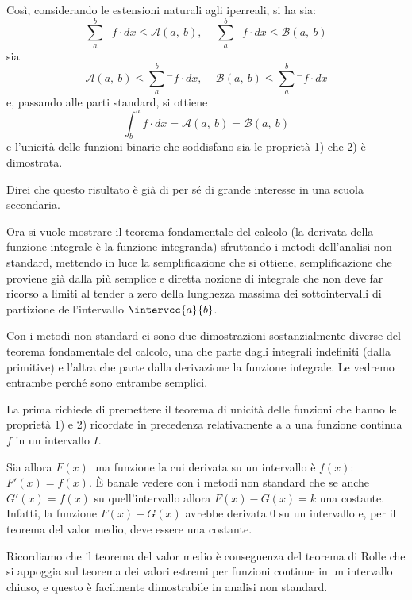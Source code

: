 Così, 
considerando le estensioni naturali agli iperreali, si ha sia:
\[\sum_a^b {}_{-}f \cdot dx \le \mathcal{A}(a,~b) \text{, } \quad
  \sum_a^b {}_{-}f \cdot dx \le \mathcal{B}(a,~b)\]
sia 
\[\mathcal{A}(a,~b) \le \sum_a^b {}^{-}f \cdot dx \text{, } \quad
  \mathcal{B}(a,~b) \le \sum_a^b {}^{-}f \cdot dx\] 
e, passando alle parti standard, si ottiene 
\[\int_b^a f \cdot dx = \mathcal{A}(a,~b) = \mathcal{B}(a,~b)\]
e l'unicità delle funzioni binarie che soddisfano sia le proprietà 1) che 2) 
è dimostrata. 

Direi che questo risultato è già di per sé di grande interesse in una scuola 
secondaria. 

Ora si vuole mostrare il teorema fondamentale del calcolo (la derivata della 
funzione integrale è la funzione integranda) sfruttando i 
metodi dell'analisi non standard, mettendo in luce la semplificazione che si 
ottiene, semplificazione che proviene già dalla più semplice e diretta 
nozione di integrale che non deve far ricorso a limiti al tender a zero della 
lunghezza massima dei sottointervalli di partizione dell'intervallo 
\(\intervcc{a}{b}\). 

Con i metodi non standard ci sono due dimostrazioni sostanzialmente diverse 
del teorema fondamentale del calcolo, una che parte dagli integrali 
indefiniti 
(dalla primitive) e l'altra che parte dalla derivazione la funzione 
integrale. 
Le vedremo entrambe perché sono entrambe semplici. 

La prima richiede di 
premettere il teorema di unicità delle funzioni che hanno le proprietà 1) e 
2) ricordate in precedenza relativamente a a una funzione continua \(f\) in 
un intervallo \(I\). 

Sia allora \(F(x)\) una funzione la cui derivata su un intervallo è 
\(f(x)\):  
\(F'(x) = f(x)\). 
È banale vedere con i metodi non standard che se anche 
\(G'(x) = f(x)\) 
su quell'intervallo allora \(F(x) - G(x) = k\) una costante. 
Infatti, la funzione 
\(F(x) - G(x)\) avrebbe derivata 0 su un intervallo e, per il teorema 
del valor medio, deve essere una costante. 

Ricordiamo che il teorema del valor medio è conseguenza del teorema
di Rolle che si appoggia sul teorema dei valori estremi per funzioni continue 
in un intervallo chiuso, e questo è facilmente dimostrabile in analisi non 
standard. 

